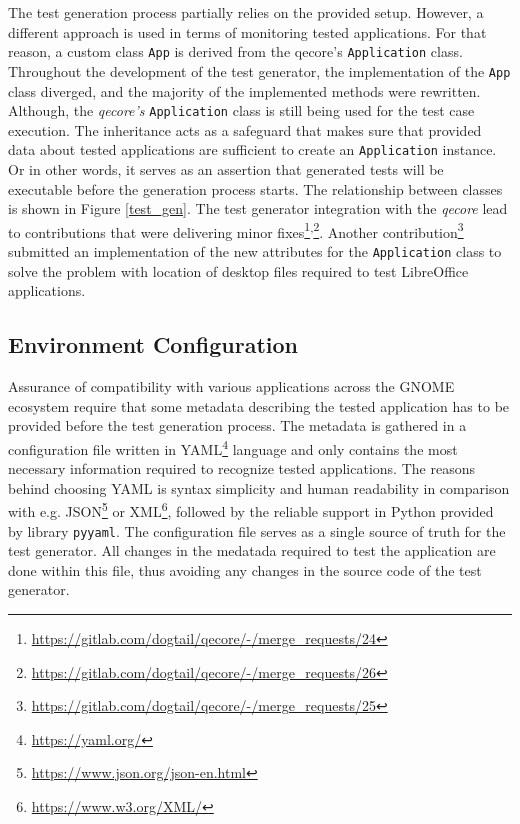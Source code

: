 The test generation process partially relies on the provided setup. However, a different approach is used in terms of monitoring tested applications. For that reason, a custom class \texttt{App} is derived from the qecore's \texttt{Application} class. Throughout the development of the test generator, the implementation of the \texttt{App} class diverged, and the majority of the implemented methods were rewritten. Although, the \textit{qecore's} \texttt{Application} class is still being used for the test case execution. The inheritance acts as a safeguard that makes sure that provided data about tested applications are sufficient to create an \texttt{Application} instance. Or in other words, it serves as an assertion that generated tests will be executable before the generation process starts. The relationship between classes is shown in Figure \ref{test_gen}. The test generator integration with the \textit{qecore} lead to contributions that were delivering minor fixes\footnote{\url{https://gitlab.com/dogtail/qecore/-/merge_requests/24}}\textsuperscript{,}\footnote{\url{https://gitlab.com/dogtail/qecore/-/merge_requests/26}}. Another contribution\footnote{\url{https://gitlab.com/dogtail/qecore/-/merge_requests/25}} submitted an implementation of the new attributes for the \texttt{Application} class to solve the problem with location of desktop files required to test LibreOffice applications.

\subsection{Environment Configuration}\label{env_config}
Assurance of compatibility with various applications across the GNOME ecosystem require that some metadata describing the tested application has to be provided before the test generation process. The metadata is gathered in a configuration file written in YAML\footnote{\url{https://yaml.org/}} language and only contains the most necessary information required to recognize tested applications. The reasons behind choosing YAML is syntax simplicity and human readability in comparison with e.g. JSON\footnote{\url{https://www.json.org/json-en.html}} or XML\footnote{\url{https://www.w3.org/XML/}}, followed by the reliable support in Python provided by library \texttt{pyyaml}.\cite{yaml} The  configuration file serves as a single source of truth for the test generator. All changes in the medatada required to test the application are done within this file, thus avoiding any changes in the source code of the test generator.

